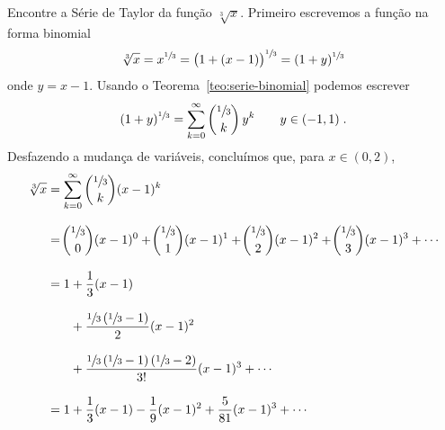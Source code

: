 \begin{example}
  Encontre a Série de Taylor da função $\sqrt[3]{x}$.
  \solution
  Primeiro escrevemos a função na forma binomial
  \[
    \sqrt[3]{x}
    = x^{\sfrac{1}{3}}
    = \big(1 + (x-1)\big)^{\sfrac{1}{3}}
    = (1+y)^{\sfrac{1}{3}}
  \]
  onde $y=x-1$.
  Usando o Teorema~\ref{teo:serie-binomial} podemos escrever
  \[
    (1+y)^{\sfrac{1}{3}} = \sum_{k=0}^\infty \binom{\sfrac{1}{3}}{k}\, y^k
    \qquad y \in(-1, 1)          \;.
  \]
  Desfazendo a mudança de variáveis, concluímos que, para $x \in(0, 2)$,
  \begin{align*}
     \sqrt[3]{x}
     & = \sum_{k=0}^\infty \binom{\sfrac{1}{3}}{k} (x-1)^k \\[3mm]
     & = \!\binom{\sfrac{1}{3}}{0} (x-1)^0
       + \!\binom{\sfrac{1}{3}}{1} (x-1)^1
       + \!\binom{\sfrac{1}{3}}{2} (x-1)^2
       + \!\binom{\sfrac{1}{3}}{3} (x-1)^3
       + \cdots \\[3mm]
     & = 1 + \frac{1}{3}(x-1) \\[3mm]
     &\hphantom{=1\;} + \frac{\sfrac{1}{3}\left(\sfrac{1}{3}-1\right)}{2}(x-1)^2 \\[3mm]
     &\hphantom{=1\;} + \frac{\sfrac{1}{3}\left(\sfrac{1}{3}-1\right)\left(\sfrac{1}{3}-2\right)}{3!}(x-1)^3
       + \cdots \\[3mm]
     & = 1 + \frac{1}{3}(x-1) - \frac{1}{9}(x-1)^2 + \frac{5}{81}(x-1)^3 + \cdots
  \end{align*}
\end{example}

